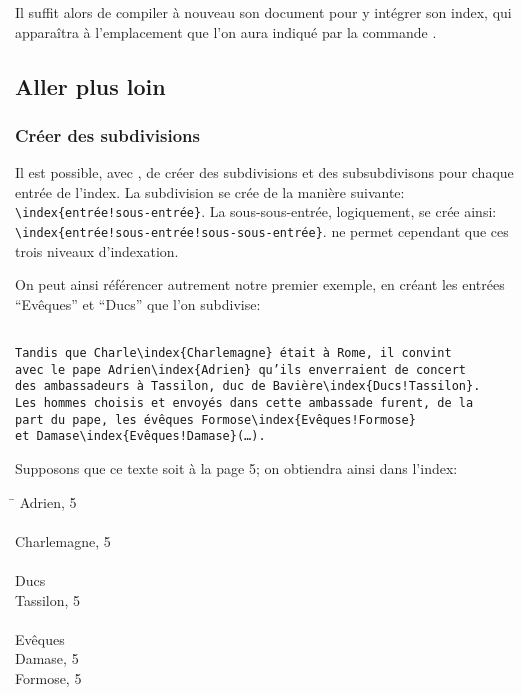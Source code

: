 Il suffit alors de compiler à nouveau son document pour y intégrer son index, qui apparaîtra à l'emplacement que l'on aura indiqué par la commande .



\subsection{Aller plus loin}
\subsubsection{Créer des subdivisions}

Il est possible, avec ,  de créer des subdivisions et des subsubdivisons  pour chaque entrée de l'index. La subdivision se crée de la manière suivante: \verb+\index{entrée!sous-entrée}+. La sous-sous-entrée, logiquement, se crée ainsi: \verb+\index{entrée!sous-entrée!sous-sous-entrée}+.  ne permet cependant que ces trois niveaux d'indexation.

On peut ainsi référencer autrement notre premier exemple, en créant les entrées \enquote{Evêques} et \enquote{Ducs} que l'on subdivise:

\begin{verbatim}

Tandis que Charle\index{Charlemagne} était à Rome, il convint 
avec le pape Adrien\index{Adrien} qu’ils enverraient de concert 
des ambassadeurs à Tassilon, duc de Bavière\index{Ducs!Tassilon}.
Les hommes choisis et envoyés dans cette ambassade furent, de la 
part du pape, les évêques Formose\index{Evêques!Formose}
et Damase\index{Evêques!Damase}(…).

\end{verbatim}

Supposons que ce texte soit à la page 5; on obtiendra ainsi dans l'index:
\begin{tabbing}
\hspace{0,5cm}  \= \kill
Adrien, 5 \\
\\
Charlemagne, 5 \\
\\
Ducs \\
\> Tassilon, 5\\
\\
Evêques \\
\> Damase, 5\\
\> Formose, 5\\

\end{tabbing}




